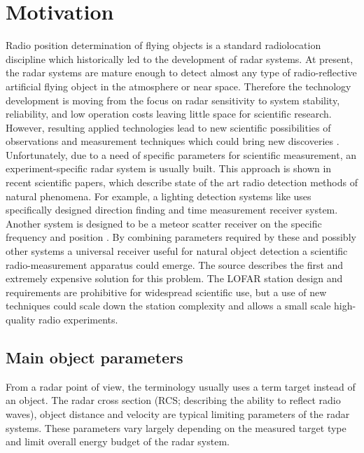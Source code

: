 \documentclass[twoside]{ctuthesis}
\theoremstyle{plain}
\theoremstyle{definition}
\theoremstyle{note}
\begin{document}
\maketitle

\chapter{Motivation}
Radio position determination of flying objects is a standard radiolocation discipline which historically led to the development of radar systems. At present, the radar systems are mature enough to detect almost any type of radio-reflective artificial flying object in the atmosphere or near space. \cite{Radar_basics} Therefore the technology development is moving from the focus on radar sensitivity to system stability, reliability, and low operation costs leaving little space for scientific research. However, resulting applied technologies lead to new scientific possibilities of observations and measurement techniques which could bring new discoveries \cite{LOFAR}. Unfortunately, due to a need of specific parameters for scientific measurement, an experiment-specific radar system is usually built. 
This approach is shown in recent scientific papers, which describe state of the art radio detection methods of natural phenomena. For example, a lighting detection systems like \cite{NMLMA} uses specifically designed direction finding and time measurement receiver system.  Another system is designed to be a meteor scatter receiver on the specific frequency and position \cite{BRAMS}. 
By combining parameters required by these and possibly other systems a universal receiver useful for natural object detection a scientific radio-measurement apparatus could emerge. The source \cite{LOFAR} describes the first and extremely expensive solution for this problem. The LOFAR station design and requirements are prohibitive for widespread scientific use, but a use of new techniques could scale down the station complexity and allows a small scale high-quality radio experiments. 

\section{Main object parameters}

From a radar point of view, the terminology usually uses a term target instead of an object. The radar cross section (RCS; describing the ability to reflect radio waves), object distance and velocity are typical limiting parameters of the radar systems. These parameters vary largely depending on the measured target type and limit overall energy budget of the radar system.
\end{document}
